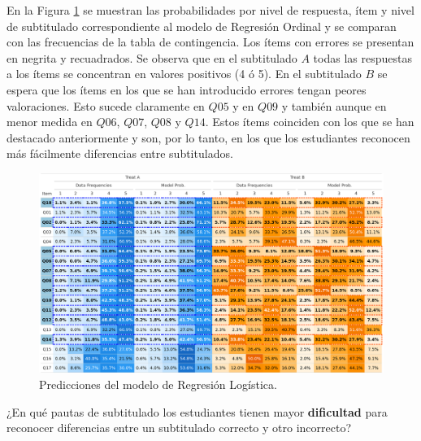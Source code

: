 \documentclass[
  12pt,
  a4paper,
  extrafontsizes,
  onecolumn,
  openright,
  table]{memoir}
\begin{document}
En la Figura \ref{fig-prob-compare} se muestran las probabilidades por
nivel de respuesta, ítem y nivel de subtitulado correspondiente al
modelo de Regresión Ordinal y se comparan con las frecuencias de la
tabla de contingencia. Los ítems con errores se presentan en negrita y
recuadrados. Se observa que en el subtitulado \(A\) todas las respuestas
a los ítems se concentran en valores positivos (4 ó 5). En el
subtitulado \(B\) se espera que los ítems en los que se han introducido
errores tengan peores valoraciones. Esto sucede claramente en \(Q05\) y
en \(Q09\) y también aunque en menor medida en \(Q06\), \(Q07\), \(Q08\)
y \(Q14\). Estos ítems coinciden con los que se han destacado
anteriormente y son, por lo tanto, en los que los estudiantes reconocen
más fácilmente diferencias entre subtitulados.

\begin{figure}[h]
\begin{adjustwidth}{-3.4cm}{}

\includegraphics[width=1.2\linewidth]{images/bayes-probs.png} \hfill{}

\caption{\label{fig-prob-compare}Predicciones del modelo de Regresión Logística.}

\end{adjustwidth}
\end{figure}

\begin{tcolorbox}[enhanced jigsaw, arc=.35mm, bottomrule=.15mm, left=2mm, colframe=quarto-callout-tip-color-frame, coltitle=black, colback=white, rightrule=.15mm, opacityback=0, breakable, leftrule=.75mm, colbacktitle=quarto-callout-tip-color!10!white, opacitybacktitle=0.6, bottomtitle=1mm, toptitle=1mm, titlerule=0mm, title=\textcolor{quarto-callout-tip-color}{\faLightbulb}\hspace{0.5em}{Objetivo específico}, toprule=.15mm]

¿En qué pautas de subtitulado los estudiantes tienen mayor
\textbf{dificultad} para reconocer diferencias entre un subtitulado
correcto y otro incorrecto?

\end{tcolorbox}
\end{document}
